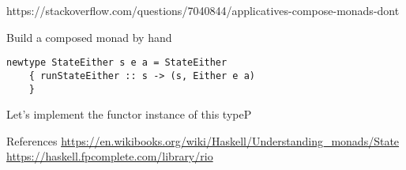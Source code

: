 https://stackoverflow.com/questions/7040844/applicatives-compose-monads-dont


 Build a composed monad by hand


\begin{verbatim}
newtype StateEither s e a = StateEither
    { runStateEither :: s -> (s, Either e a)
    }
\end{verbatim}

Let's implement the functor instance of this typeP


 References
 \url{https://en.wikibooks.org/wiki/Haskell/Understanding_monads/State}
 \url{https://haskell.fpcomplete.com/library/rio}
